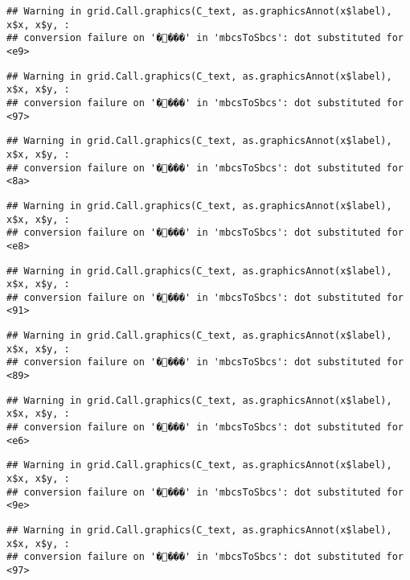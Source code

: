 \documentclass[
]{article}
\begin{document}
\begin{verbatim}
## Warning in grid.Call.graphics(C_text, as.graphicsAnnot(x$label), x$x, x$y, :
## conversion failure on '����' in 'mbcsToSbcs': dot substituted for <e9>
\end{verbatim}

\begin{verbatim}
## Warning in grid.Call.graphics(C_text, as.graphicsAnnot(x$label), x$x, x$y, :
## conversion failure on '����' in 'mbcsToSbcs': dot substituted for <97>
\end{verbatim}

\begin{verbatim}
## Warning in grid.Call.graphics(C_text, as.graphicsAnnot(x$label), x$x, x$y, :
## conversion failure on '����' in 'mbcsToSbcs': dot substituted for <8a>
\end{verbatim}

\begin{verbatim}
## Warning in grid.Call.graphics(C_text, as.graphicsAnnot(x$label), x$x, x$y, :
## conversion failure on '����' in 'mbcsToSbcs': dot substituted for <e8>
\end{verbatim}

\begin{verbatim}
## Warning in grid.Call.graphics(C_text, as.graphicsAnnot(x$label), x$x, x$y, :
## conversion failure on '����' in 'mbcsToSbcs': dot substituted for <91>
\end{verbatim}

\begin{verbatim}
## Warning in grid.Call.graphics(C_text, as.graphicsAnnot(x$label), x$x, x$y, :
## conversion failure on '����' in 'mbcsToSbcs': dot substituted for <89>
\end{verbatim}

\begin{verbatim}
## Warning in grid.Call.graphics(C_text, as.graphicsAnnot(x$label), x$x, x$y, :
## conversion failure on '����' in 'mbcsToSbcs': dot substituted for <e6>
\end{verbatim}

\begin{verbatim}
## Warning in grid.Call.graphics(C_text, as.graphicsAnnot(x$label), x$x, x$y, :
## conversion failure on '����' in 'mbcsToSbcs': dot substituted for <9e>
\end{verbatim}

\begin{verbatim}
## Warning in grid.Call.graphics(C_text, as.graphicsAnnot(x$label), x$x, x$y, :
## conversion failure on '����' in 'mbcsToSbcs': dot substituted for <97>
\end{verbatim}
\end{document}
